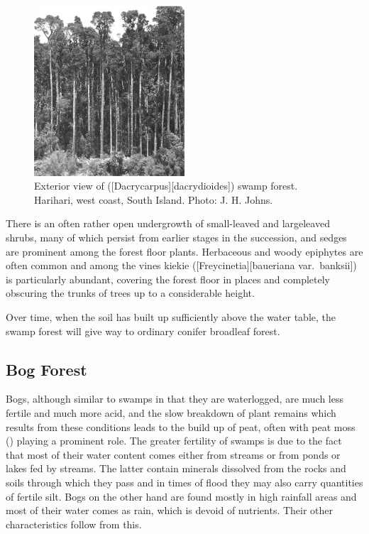 \begin{figure}
	\includegraphics[width=0.5\textwidth]{graphics/figure67kahikatea.jpg}
	\centering
	\caption[Exterior view of kahikatea swamp forest]{Exterior view of  ([Dacrycarpus][dacrydioides]) swamp forest.
	Harihari, west coast, South Island.
	Photo: J. H. Johns.}%
	\label{fig:67kahikatea}
\end{figure}

There is an often rather open undergrowth of small-leaved and largeleaved shrubs, many of which persist from earlier stages in the succession, and sedges are prominent among the forest floor plants.
Herbaceous and woody epiphytes are often common and among the vines kiekie ([Freycinetia][baueriana var.\ banksii]) is particularly abundant, covering the forest floor in places and completely obscuring the trunks of trees up to a considerable height.

Over time, when the soil has built up sufficiently above the water table, the swamp forest will give way to ordinary conifer broadleaf forest.

\subsection{Bog Forest}

Bogs, although similar to swamps in that they are waterlogged, are much less fertile and much more acid, and the slow breakdown of plant remains which results from these conditions leads to the build up of peat, often with peat moss () playing a prominent role.
The greater fertility of swamps is due to the fact that most of their water content comes either from streams or from ponds or lakes fed by streams.
The latter contain minerals dissolved from the rocks and soils through which they pass and in times of flood they may also carry quantities of fertile silt.
Bogs on the other hand are found mostly in high rainfall areas and most of their water comes as rain, which is devoid of nutrients.
Their other characteristics follow from this.

